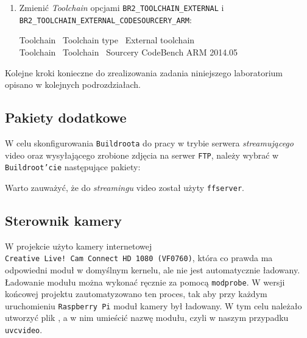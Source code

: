 \documentclass{article}
\newenvironment{ttblock}{\ttfamily}{\par}
\begin{document}
\begin{enumerate}
\item Zmienić \emph{Toolchain} opcjami \texttt{BR2\_TOOLCHAIN\_EXTERNAL} i\\ \texttt{BR2\_TOOLCHAIN\_EXTERNAL\_CODESOURCERY\_ARM}:

\begin{ttblock}
Toolchain \textrightarrow\ Toolchain type \textrightarrow\ External toolchain\\
Toolchain \textrightarrow\ Toolchain \textrightarrow\ Sourcery CodeBench ARM 2014.05
\end{ttblock}

%
\end{enumerate}

Kolejne kroki konieczne do zrealizowania zadania niniejszego laboratorium opisano w kolejnych podrozdziałach.


\subsection{Pakiety dodatkowe}

W celu skonfigurowania \texttt{Buildroota} do pracy w trybie serwera \emph{streamującego} video oraz wysyłającego zrobione zdjęcia na serwer \texttt{FTP}, należy wybrać w \texttt{Buildroot'cie} następujące pakiety:
\begin{center}
\texttt{}
\end{center}
Warto zauważyć, że do \emph{streamingu} video został użyty \texttt{ffserver}.


\subsection{Sterownik kamery}

W projekcie użyto kamery internetowej \texttt{Creative~Live!~Cam~Connect~HD~1080~(VF0760)}, która co prawda ma odpowiedni moduł w domyślnym kernelu, ale nie jest automatycznie ładowany. Ładowanie modułu można wykonać ręcznie za pomocą \texttt{modprobe}. W wersji końcowej projektu zautomatyzowano ten proces, tak aby przy każdym uruchomieniu \texttt{Raspberry~Pi} moduł kamery był ładowany. W tym celu należało utworzyć plik , a w nim umieścić nazwę modułu, czyli w naszym przypadku \texttt{uvcvideo}.
\end{document}

